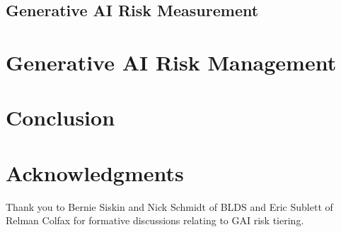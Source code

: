 \documentclass[fleqn]{article}
\begin{document}

\subsection{Generative AI Risk Measurement}\label{sec:measure}




\section{Generative AI Risk Management}\label{sec:manage}

 


\section*{Conclusion}

\section*{Acknowledgments}

Thank you to Bernie Siskin and Nick Schmidt of BLDS and Eric Sublett of Relman Colfax for formative discussions relating to GAI risk tiering. 
\end{document}
